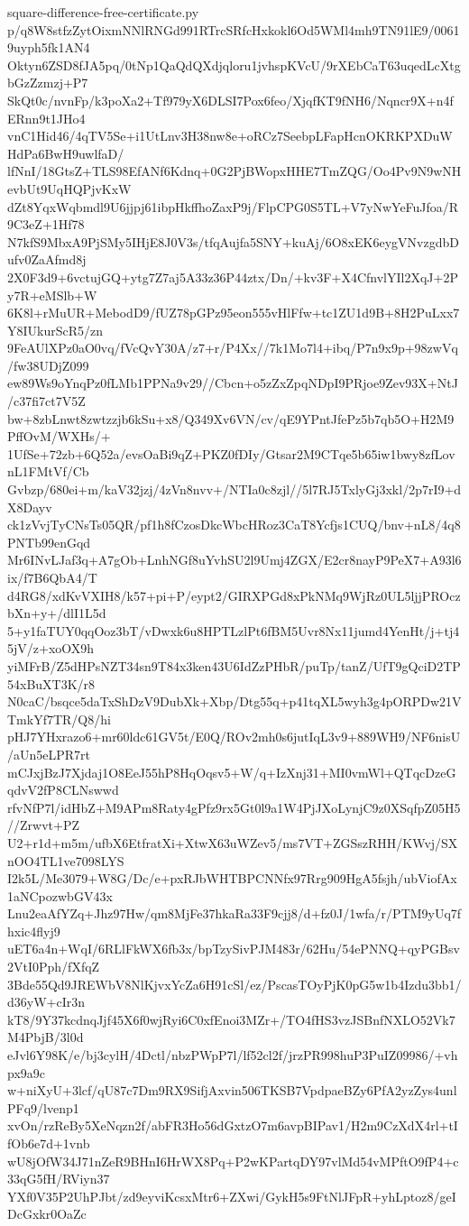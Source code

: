 \documentclass[11pt]{article}
\theoremstyle{definition}
\theoremstyle{remark}
\begin{document}
\begin{filecontents*}[overwrite]{square-difference-free-certificate.py}
p/q8W8stfzZytOixmNNlRNGd991RTrcSRfcHxkokl6Od5WMl4mh9TN91lE9/00619uyph5fk1AN4
Oktyn6ZSD8fJA5pq/0tNp1QaQdQXdjqloru1jvhspKVcU/9rXEbCaT63uqedLcXtgbGzZzmzj+P7
SkQt0c/nvnFp/k3poXa2+Tf979yX6DLSI7Pox6feo/XjqfKT9fNH6/Nqncr9X+n4fERnn9t1JHo4
vnC1Hid46/4qTV5Se+i1UtLnv3H38nw8e+oRCz7SeebpLFapHcnOKRKPXDuWHdPa6BwH9uwlfaD/
lfNnI/18GtsZ+TLS98EfANf6Kdnq+0G2PjBWopxHHE7TmZQG/Oo4Pv9N9wNHevbUt9UqHQPjvKxW
dZt8YqxWqbmdl9U6jjpj61ibpHkffhoZaxP9j/FlpCPG0S5TL+V7yNwYeFuJfoa/R9C3eZ+1Hf78
N7kfS9MbxA9PjSMy5IHjE8J0V3s/tfqAujfa5SNY+kuAj/6O8xEK6eygVNvzgdbDufv0ZaAfmd8j
2X0F3d9+6vctujGQ+ytg7Z7aj5A33z36P44ztx/Dn/+kv3F+X4CfnvlYIl2XqJ+2Py7R+eMSlb+W
6K8l+rMuUR+MebodD9/fUZ78pGPz95eon555vHlFfw+tc1ZU1d9B+8H2PuLxx7Y8IUkurScR5/zn
9FeAUlXPz0aO0vq/fVcQvY30A/z7+r/P4Xx//7k1Mo7l4+ibq/P7n9x9p+98zwVq/fw38UDjZ099
ew89Ws9oYnqPz0fLMb1PPNa9v29//Cbcn+o5zZxZpqNDpI9PRjoe9Zev93X+NtJ/c37fi7ct7V5Z
bw+8zbLnwt8zwtzzjb6kSu+x8/Q349Xv6VN/cv/qE9YPntJfePz5b7qb5O+H2M9PffOvM/WXHs/+
1UfSe+72zb+6Q52a/evsOaBi9qZ+PKZ0fDIy/Gtsar2M9CTqe5b65iw1bwy8zfLovnL1FMtVf/Cb
Gvbzp/680ei+m/kaV32jzj/4zVn8nvv+/NTIa0c8zjl//5l7RJ5TxlyGj3xkl/2p7rI9+dX8Dayv
ck1zVvjTyCNsTs05QR/pf1h8fCzosDkcWbcHRoz3CaT8Ycfjs1CUQ/bnv+nL8/4q8PNTb99enGqd
Mr6INvLJaf3q+A7gOb+LnhNGf8uYvhSU2l9Umj4ZGX/E2cr8nayP9PeX7+A93l6ix/f7B6QbA4/T
d4RG8/xdKvVXIH8/k57+pi+P/eypt2/GIRXPGd8xPkNMq9WjRz0UL5ljjPROczbXn+y+/dlI1L5d
5+y1faTUY0qqOoz3bT/vDwxk6u8HPTLzlPt6fBM5Uvr8Nx11jumd4YenHt/j+tj45jV/z+xoOX9h
yiMFrB/Z5dHPsNZT34sn9T84x3ken43U6IdZzPHbR/puTp/tanZ/UfT9gQciD2TP54xBuXT3K/r8
N0caC/bsqce5daTxShDzV9DubXk+Xbp/Dtg55q+p41tqXL5wyh3g4pORPDw21VTmkYf7TR/Q8/hi
pHJ7YHxrazo6+mr60ldc61GV5t/E0Q/ROv2mh0s6jutIqL3v9+889WH9/NF6nisU/aUn5eLPR7rt
mCJxjBzJ7Xjdaj1O8EeJ55hP8HqOqsv5+W/q+IzXnj31+MI0vmWl+QTqcDzeGqdvV2fP8CLNswwd
rfvNfP7l/idHbZ+M9APm8Raty4gPfz9rx5Gt0l9a1W4PjJXoLynjC9z0XSqfpZ05H5//Zrwvt+PZ
U2+r1d+m5m/ufbX6EtfratXi+XtwX63uWZev5/ms7VT+ZGSszRHH/KWvj/SXnOO4TL1ve7098LYS
I2k5L/Me3079+W8G/Dc/e+pxRJbWHTBPCNNfx97Rrg909HgA5fsjh/ubViofAx1aNCpozwbGV43x
Lnu2eaAfYZq+Jhz97Hw/qm8MjFe37hkaRa33F9cjj8/d+fz0J/1wfa/r/PTM9yUq7fhxic4flyj9
uET6a4n+WqI/6RLlFkWX6fb3x/bpTzySivPJM483r/62Hu/54ePNNQ+qyPGBsv2VtI0Pph/fXfqZ
3Bde55Qd9JREWbV8NlKjvxYcZa6H91cSl/ez/PscasTOyPjK0pG5w1b4Izdu3bb1/d36yW+cIr3n
kT8/9Y37kcdnqJjf45X6f0wjRyi6C0xfEnoi3MZr+/TO4fHS3vzJSBnfNXLO52Vk7M4PbjB/3l0d
eJvl6Y98K/e/bj3cylH/4Dctl/nbzPWpP7l/lf52cl2f/jrzPR998huP3PuIZ09986/+vhpx9a9c
w+niXyU+3lcf/qU87c7Dm9RX9SifjAxvin506TKSB7VpdpaeBZy6PfA2yzZys4unlPFq9/lvenp1
xvOn/rzReBy5XeNqzn2f/abFR3Ho56dGxtzO7m6avpBIPav1/H2m9CzXdX4rl+tIfOb6e7d+1vnb
wU8jOfW34J71nZeR9BHnI6HrWX8Pq+P2wKPartqDY97vlMd54vMPftO9fP4+c33qG5fH/RViyn37
YXf0V35P2UhPJbt/zd9eyviKcsxMtr6+ZXwi/GykH5s9FtNlJFpR+yhLptoz8/geIDcGxkr0OaZc

\end{filecontents*}
\end{document}
